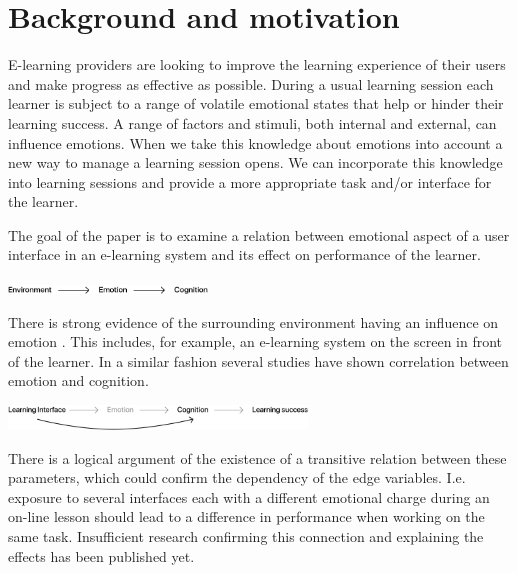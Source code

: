 

\pagebreak

\section{Background and motivation}

E-learning providers are looking to improve the learning experience of their users and make progress as effective as possible. 
During a usual learning session each learner is subject to a range of volatile emotional states that help or hinder their learning success. 
A range of factors and stimuli, both internal and external, can influence emotions. 
When we take this knowledge about emotions into account a new way to manage a learning session opens. We can incorporate this knowledge into learning sessions and provide a more appropriate task and/or interface for the learner.

The goal of the paper is to examine a relation between emotional aspect of a user interface in an e-learning system and its effect on performance of the learner.


\begin{center}
	\includegraphics[width=200px]{images/relation1.png}
\end{center}
 
There is strong evidence of the surrounding environment having an influence on emotion \cite{Johnson2000, Arockiam2013, Bertamini2013}. This includes, for example, an e-learning system on the screen in front of the learner. In a similar fashion several studies have shown correlation between emotion and cognition.

\begin{center}
\includegraphics[width=300px]{images/relation2.png}
\end{center}

There is a logical argument of the existence of a transitive relation between these parameters, which could confirm the dependency of the edge variables. 
I.e. exposure to several interfaces each with a different emotional charge during an on-line lesson should lead to a difference in performance when working on the same task.
Insufficient research confirming this connection and explaining the effects has been published yet. 

